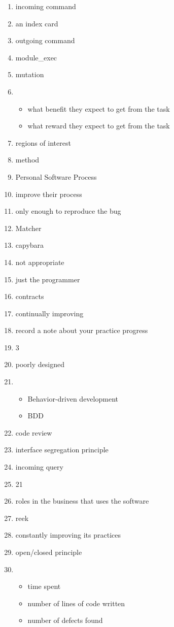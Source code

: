 \documentclass{exam}
\begin{document}
\begin{enumerate}
\item incoming command
\item an index card
\item outgoing command
\item module\_exec
\item mutation
\item \begin{itemize}
\item what benefit they expect to get from the task
\item what reward they expect to get from the task
\end{itemize}
\item regions of interest
\item method
\item Personal Software Process
\item improve their process
\item only enough to reproduce the bug
\item Matcher
\item capybara
\item not appropriate
\item just the programmer
\item contracts
\item continually improving
\item record a note about your practice progress
\item 3
\item poorly designed
\item \begin{itemize}
\item Behavior-driven development
\item BDD
\end{itemize}
\item code review
\item interface segregation principle
\item incoming query
\item 21
\item roles in the business that uses the software
\item reek
\item constantly improving its practices
\item open/closed principle
\item \begin{itemize}
\item time spent
\item number of lines of code written
\item number of defects found

\end{itemize}
\end{enumerate}
\end{document}
